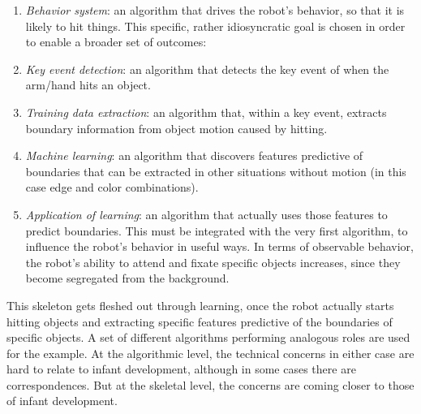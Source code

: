 

\begin{enumerate} \pflist

\item {\em Behavior system}: an algorithm that drives the robot's
behavior, so that it is likely to hit things.  This specific, rather
idiosyncratic goal is chosen in order to enable a broader set of 
outcomes:

\item {\em Key event detection}: an algorithm that detects the key event of
when the arm/hand hits an object.

\item {\em Training data extraction}: an algorithm that, within a key event,
extracts boundary information from object motion caused by hitting.

\item {\em Machine learning}: an algorithm that discovers features
predictive of boundaries that can be extracted in other situations
without motion (in this case edge and color combinations).

\item {\em Application of learning}: an algorithm that actually uses
those features to predict boundaries.  This must be integrated with
the very first algorithm, to influence the robot's behavior in useful
ways.  In terms of observable behavior, the robot's ability to attend
and fixate specific objects increases, since they become segregated from
the background.

\end{enumerate}

\noindent
This skeleton gets fleshed out through learning, once the
robot actually starts hitting objects and extracting specific features
predictive of the boundaries of specific objects.  
%
A set of different algorithms performing analogous roles are used
for the  example.
%
%
At the algorithmic level, the technical concerns 
in either
case are hard to relate to
infant development, although in some cases there are correspondences.
%
But at the skeletal level, the concerns are coming closer to those of
infant development.

